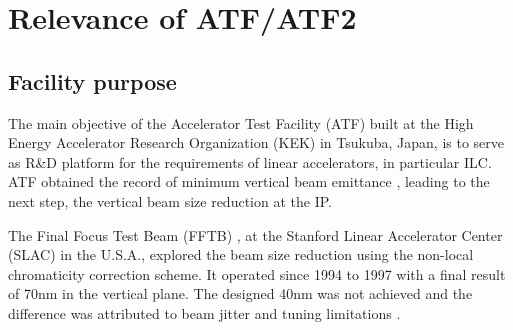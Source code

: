 \chapter{Relevance of ATF/ATF2}
\section{Facility purpose}
The main objective of the Accelerator Test Facility (ATF) built at the High Energy Accelerator Research Organization (KEK) in Tsukuba, Japan, is to serve as R\&D platform for the requirements of linear accelerators, in particular ILC. ATF obtained the record of minimum vertical beam emittance \cite{Kubo:2001ps,PhysRevLett.92.054802}, leading to the next step, the vertical beam size reduction at the IP.\par
The Final Focus Test Beam (FFTB) \cite{Berndt:1991ug}, at the Stanford Linear Accelerator Center (SLAC) in the  U.S.A., explored the beam size reduction using the non-local chromaticity correction scheme. It operated since 1994 to 1997 with a final result of 70nm in the vertical plane. The designed 40nm was not achieved and the difference was attributed to beam jitter and tuning limitations \cite{Araki1}.\par
